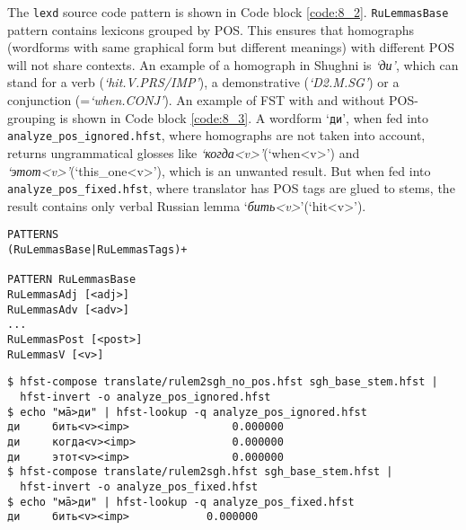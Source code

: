 The \texttt{lexd} source code pattern is shown in Code block \ref{code:8_2}. \texttt{RuLemmasBase} pattern contains lexicons grouped by POS. This ensures that homographs (wordforms with same graphical form but different meanings) with different POS will not share contexts. An example of a homograph in Shughni is \textit{`ди'}, which can stand for a verb (\textit{`hit.V.PRS/IMP'}), a demonstrative (\textit{`D2.M.SG'}) or a conjunction (=\textit{`when.CONJ'}). An example of FST with and without POS-grouping is shown in Code block \ref{code:8_3}. A wordform `\texttt{ди}', when fed into \texttt{analyze\_pos\_ignored.hfst}, where homographs are not taken into account, returns ungrammatical glosses like \textit{`когда<v>'}(`when<v>') and \textit{`этот<v>'}(`this\_one<v>'), which is an unwanted result. But when fed into \texttt{analyze\_pos\_fixed.hfst}, where translator has POS tags are glued to stems, the result contains only verbal Russian lemma `\textit{бить<v>}'(`hit<v>').
\begin{code_frame}[float,floatplacement=h]
    \begin{footnotesize}\codespacing
    \begin{verbatim}
PATTERNS
(RuLemmasBase|RuLemmasTags)+

PATTERN RuLemmasBase
RuLemmasAdj [<adj>]
RuLemmasAdv [<adv>]
...
RuLemmasPost [<post>]
RuLemmasV [<v>]
    \end{verbatim}
    \end{footnotesize}
    \tcblower
    \label{code:8_2}
\end{code_frame}

\begin{code_frame}[float,floatplacement=!htbp]
    \begin{footnotesize}\codespacing
    \begin{verbatim}
$ hfst-compose translate/rulem2sgh_no_pos.hfst sgh_base_stem.hfst | 
  hfst-invert -o analyze_pos_ignored.hfst
$ echo "мā>ди" | hfst-lookup -q analyze_pos_ignored.hfst
ди     бить<v><imp>                0.000000
ди     когда<v><imp>               0.000000
ди     этот<v><imp>                0.000000
$ hfst-compose translate/rulem2sgh.hfst sgh_base_stem.hfst | 
  hfst-invert -o analyze_pos_fixed.hfst
$ echo "мā>ди" | hfst-lookup -q analyze_pos_fixed.hfst
ди     бить<v><imp>            0.000000
    \end{verbatim}
    \end{footnotesize}
    \tcblower
    \label{code:8_3}
\end{code_frame}

